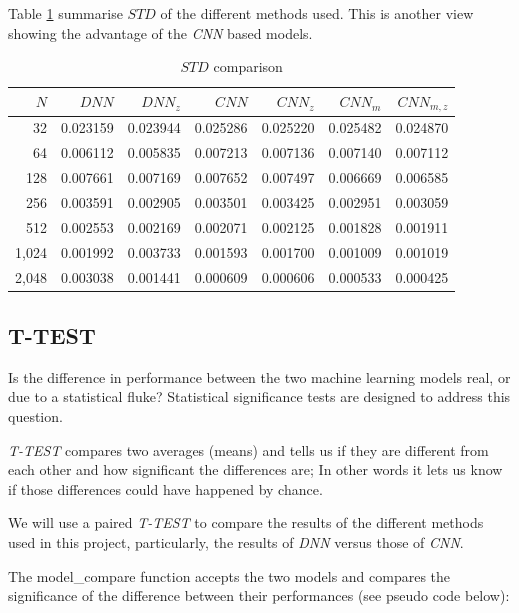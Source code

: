 \documentclass[a4paper, 12pt]{report}
\begin{document}
Table \ref{table:STD-comparison} summarise $STD$ of the different methods used.
This is another view showing the advantage of the \textit{CNN} based models.  
\begin{table}[!htb]
    \sffamily
    \scriptsize
    \centering
    \begin{tabular}{r r r r r r r} 
        $N$ & $DNN$ & $DNN_z$ & $CNN$ & $CNN_z$ & $CNN_m$ & $CNN_{m,z}$ \\
        \hline
    	32 & 0.023159 & 0.023944 & 0.025286 & 0.025220 & 0.025482 & 0.024870 \\
    	64 & 0.006112 & 0.005835 & 0.007213 & 0.007136 & 0.007140 & 0.007112 \\
    	128 & 0.007661 & 0.007169 & 0.007652 & 0.007497 & 0.006669 & 0.006585 \\
    	256 & 0.003591 & 0.002905 & 0.003501 & 0.003425 & 0.002951 & 0.003059 \\
    	512 & 0.002553 & 0.002169 & 0.002071 & 0.002125 & 0.001828 & 0.001911 \\
    	1,024 & 0.001992 & 0.003733 & 0.001593 & 0.001700 & 0.001009 & 0.001019 \\
    	2,048 & 0.003038 & 0.001441 & 0.000609 & 0.000606 & 0.000533 & 0.000425 \\
    \end{tabular}
    \caption{$STD$ comparison}
    \label{table:STD-comparison}
\end{table}


\subsection{T-TEST}
Is the difference in performance between the two machine learning models real, or due to a statistical fluke? Statistical significance tests are designed to address this question.

\textit{T-TEST} compares two averages (means) and tells us if they are different from each other and how significant the differences are; In other words it lets us know if those differences could have happened by chance.

We will use a paired \textit{T-TEST} to compare the results of the different methods used in this project, particularly, the results of \textit{DNN} versus those of \textit{CNN}.

The model\_compare function accepts the two models and compares the significance of the difference between their performances (see pseudo code below):
\end{document}
